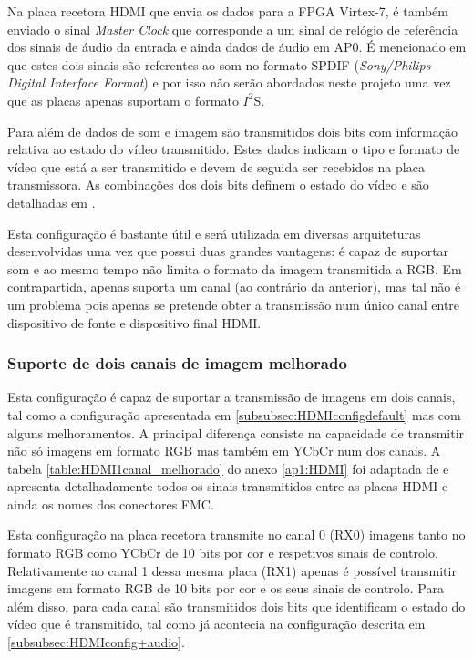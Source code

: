 Na placa recetora HDMI que envia os dados para a FPGA Virtex-7, é também enviado o sinal \textit{Master Clock} que corresponde a um sinal de relógio de referência dos sinais de áudio da entrada e ainda dados de áudio em AP0. É mencionado em \cite{R016} que estes dois sinais são referentes ao som no formato SPDIF (\textit{Sony/Philips Digital Interface Format}) e por isso não serão abordados neste projeto uma vez que as placas apenas suportam o formato $I^{2}$S.

Para além de dados de som e imagem são transmitidos dois bits com informação relativa ao estado do vídeo transmitido. Estes dados indicam o tipo e formato de vídeo que está a ser transmitido e devem de seguida ser recebidos na placa transmissora. As combinações dos dois bits definem o estado do vídeo e são detalhadas em \cite{R014}.

Esta configuração é bastante útil e será utilizada em diversas arquiteturas desenvolvidas uma vez que possui duas grandes vantagens: é capaz de suportar som e ao mesmo tempo não limita o formato da imagem transmitida a RGB. Em contrapartida, apenas suporta um canal (ao contrário da anterior), mas tal não é um problema pois apenas se pretende obter a transmissão num único canal entre dispositivo de fonte e dispositivo final HDMI. 


\subsubsection{Suporte de dois canais de imagem melhorado} \label{subsubsec:HDMIconfigMelhorado}


Esta configuração é capaz de suportar a transmissão de imagens em dois canais, tal como a configuração apresentada em \ref{subsubsec:HDMIconfigdefault} mas com alguns melhoramentos. A principal diferença consiste na capacidade de transmitir não só imagens em formato RGB mas também em YCbCr num dos canais. A tabela \ref{table:HDMI1canal_melhorado} do anexo \ref{ap1:HDMI} foi adaptada de \cite{R013} e apresenta detalhadamente todos os sinais transmitidos entre as placas HDMI e ainda os nomes dos conectores FMC.

Esta configuração na placa recetora transmite no canal 0 (RX0) imagens tanto no formato RGB como YCbCr de 10 bits por cor e respetivos sinais de controlo. Relativamente ao canal 1 dessa mesma placa (RX1) apenas é possível transmitir imagens em formato RGB de 10 bits por cor e os seus sinais de controlo. Para além disso, para cada canal são transmitidos dois bits que identificam o estado do vídeo que é transmitido, tal como já acontecia na configuração descrita em \ref{subsubsec:HDMIconfig+audio}.

